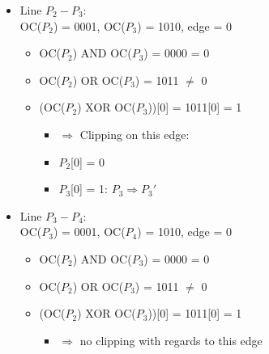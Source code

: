 \documentclass{article}
\begin{document}
\begin{itemize}
    \item Line $P_2 - P_3$:\\
    OC($P_2$) = 0001, OC($P_3$) = 1010, edge = 0
    \begin{itemize}
        \item OC($P_2$) AND OC($P_3$) = 0000 = 0
        \item OC($P_2$) OR OC($P_3$) = 1011 $\neq$ 0
        \item (OC($P_2$) XOR OC($P_3$))[0] = 1011[0] = 1
            \begin{itemize}
                \item[] $\Rightarrow$ Clipping on this edge:
                \item[] $P_2$[0] = 0
                \item[] $P_3$[0] = 1: $P_3 \Rightarrow P_3'$
            \end{itemize}
    \end{itemize}
    
    \item Line $P_3 - P_4$:\\
    OC($P_3$) = 0001, OC($P_4$) = 1010, edge = 0
    \begin{itemize}
        \item OC($P_2$) AND OC($P_3$) = 0000 = 0
        \item OC($P_2$) OR OC($P_3$) = 1011 $\neq$ 0
        \item (OC($P_2$) XOR OC($P_3$))[0] = 1011[0] = 1
        \begin{itemize}
            \item[] $\Rightarrow$ no clipping with regards to this edge
        \end{itemize}
    \end{itemize}
    
\end{itemize}
\end{document}
